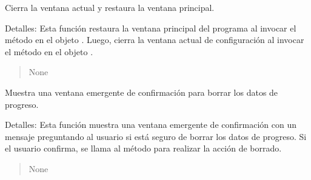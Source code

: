 \documentclass[letterpaper,10pt,spanish]{sphinxmanual}
\begin{document}
\begin{fulllineitems}

\begin{fulllineitems}
\label{\detokenize{configuracion:configuracion.Configuracion.cerrar_ventana}}
\pysigstartsignatures
{}
\pysigstopsignatures
\sphinxAtStartPar
Cierra la ventana actual y restaura la ventana principal.

\sphinxAtStartPar
Detalles:
Esta función restaura la ventana principal del programa al invocar el método
 en el objeto . Luego, cierra la ventana actual
de configuración al invocar el método  en el objeto .
\begin{quote}\begin{description}
\sphinxAtStartPar
None

\end{description}\end{quote}

\end{fulllineitems}


\begin{fulllineitems}
\label{\detokenize{configuracion:configuracion.Configuracion.mostrar_confirmacion}}
\pysigstartsignatures
{}
\pysigstopsignatures
\sphinxAtStartPar
Muestra una ventana emergente de confirmación para borrar los datos de progreso.

\sphinxAtStartPar
Detalles:
Esta función muestra una ventana emergente de confirmación con un mensaje preguntando
al usuario si está seguro de borrar los datos de progreso. Si el usuario confirma,
se llama al método  para realizar la acción de borrado.
\begin{quote}\begin{description}
\sphinxAtStartPar
None

\end{description}\end{quote}

\end{fulllineitems}


\end{fulllineitems}
\end{document}
